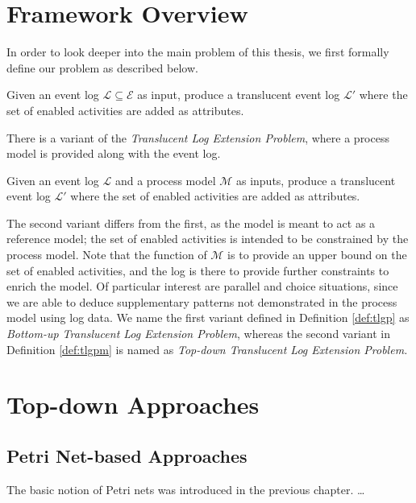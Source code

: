 \section{Framework Overview}
In order to look deeper into the main problem of this thesis, we first formally define our problem as described below.

\begin{definition}
\label{def:tlgp}
    Given an event log $\mathcal{L} \subseteq \mathcal{E}$ as input, produce a translucent event log $\mathcal{L'}$ where the set of enabled activities are added as attributes. 
\end{definition}

There is a variant of the \emph{Translucent Log Extension Problem}, where a process model is provided along with the event log.

\begin{definition}
\label{def:tlgpm}
    Given an event log $\mathcal{L}$ and a process model $\mathcal{M}$ as inputs, produce a translucent event log $\mathcal{L'}$ where the set of enabled activities are added as attributes. 
\end{definition}

The second variant differs from the first, as the model is meant to act as a reference model; the set of enabled activities is intended to be constrained by the process model. Note that the function of $\mathcal{M}$ is to provide an upper bound on the set of enabled activities, and the log is there to provide further constraints to enrich the model. Of particular interest are parallel and choice situations, since we are able to deduce supplementary patterns not demonstrated in the process model using log data. We name the first variant defined in Definition \ref{def:tlgp} as \emph{Bottom-up Translucent Log Extension Problem}, whereas the second variant in Definition \ref{def:tlgpm} is named as \emph{Top-down Translucent Log Extension Problem.}

\section{Top-down Approaches}

\subsection{Petri Net-based Approaches}

The basic notion of Petri nets was introduced in the previous chapter. \dots

